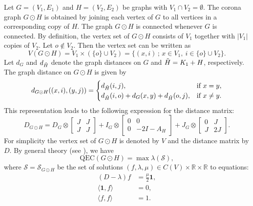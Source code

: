 \documentclass[pdflatex,sn-mathphys-num]{sn-jnl}
\theoremstyle{thmstyleone}%
\theoremstyle{thmstyletwo}%
\theoremstyle{thmstylethree}%
\begin{document}
Let $G=(V_1,E_1)$ and $H=(V_2,E_2)$ be graphs with $V_1\cap V_2=\emptyset$.
The corona graph $G\odot H$ is obtained by joining each vertex of $G$
to all vertices in a corresponding copy of $H$.
The graph $G\odot H$ is connected whenever $G$ is connected. By definition, the vertex set of $G\odot H$ consists of $V_1$
together with $|V_1|$ copies of $V_2$.
Let $o \notin V_2$. Then the vertex set can be written as
\begin{equation}\label{eq:vertex-corona}
V(G\odot H)
=
V_1 \times (\{o\} \cup V_2)
=
\{(x,i) \,;\, x \in V_1,\ i \in \{o\} \cup V_2\}.
\end{equation}
Let $d_G$ and $d_{\Tilde{H}}$ denote the graph distances on
$G$ and $\Tilde{H}=K_1+H$, respectively.
The graph distance on $G\odot H$ is given by
\[
d_{G\odot H}((x,i),(y,j))=
\begin{cases}
d_{\Tilde{H}}(i,j), & \text{if } x=y, \\
d_{\Tilde{H}}(i,o)+d_G(x,y)+d_{\Tilde{H}}(o,j), & \text{if } x\neq y.
\end{cases}
\]
This representation leads to the following expression for the distance matrix:
\begin{equation}\label{eq:distance-corona}
D_{G\odot H}
=
D_G\otimes 
\begin{bmatrix} 
J & J \\ 
J & J 
\end{bmatrix}
+
I_G \otimes 
\begin{bmatrix} 
0 & 0 \\ 
0 & -2I-A_H 
\end{bmatrix}
+
J_G \otimes 
\begin{bmatrix} 
0 & J \\ 
J & 2J 
\end{bmatrix}.
\end{equation}
For simplicity the vertex set of $G\odot H$ is denoted by $V$
and the distance matrix by $D$. By general theory (see \cite{Obata-Zakiyyah2018}), we have
%
\begin{equation}\label{03eqn:starting formula for QEC(1)}
\mathrm{QEC}(G\odot H)=\max \lambda(\mathcal{S}),
\end{equation}
%
where $\mathcal{S}=\mathcal{S}_{G\odot H}$ be the set of solutions 
$(f,\lambda,\mu)\in C(V)\times \mathbb{R}\times \mathbb{R}$
to equations:
%
\begin{align}
(D-\lambda)f &=\frac{\mu}{2}\mathbf{1}, 
\label{02eqn:basic equation (1)} \\
\langle \mathbf{1},f\rangle &=0, 
\label{02eqn:basic equation (2)} \\
\langle f,f\rangle &=1.
\label{02eqn:basic equation (3)}
\end{align}
\end{document}

